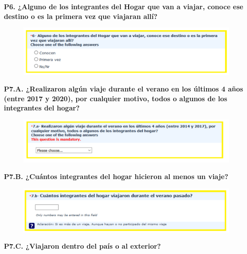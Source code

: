 \documentclass[
  openany]{book}
\begin{document}
\textbf{P6. ¿Alguno de los integrantes del Hogar que van a viajar, conoce ese destino o es la primera vez que viajaran allí?}

\begin{figure}

{\centering \includegraphics[width=1\linewidth]{imagenes/figura6-141} 

}

\end{figure}

\textbf{P7.A. ¿Realizaron algún viaje durante el verano en los últimos 4 años (entre 2017 y 2020), por cualquier motivo, todos o algunos de los integrantes del hogar?}

\begin{figure}

{\centering \includegraphics[width=1\linewidth]{imagenes/figura6-142} 

}

\end{figure}

\textbf{P7.B. ¿Cuántos integrantes del hogar hicieron al menos un viaje?}

\begin{figure}

{\centering \includegraphics[width=1\linewidth]{imagenes/figura6-143} 

}

\end{figure}

\textbf{P7.C. ¿Viajaron dentro del país o al exterior?}
\end{document}
